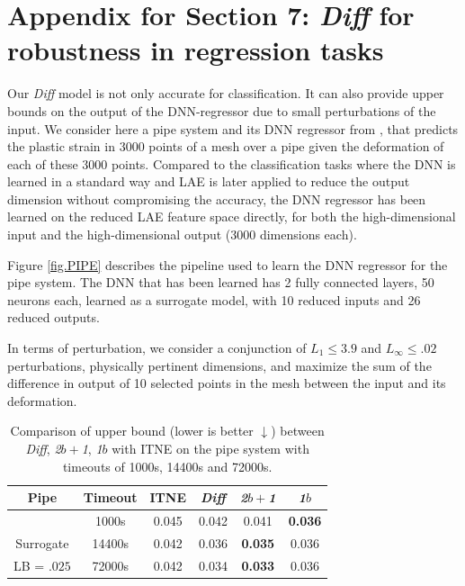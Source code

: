 \section{Appendix for Section 7: {\em Diff} for robustness in regression tasks}


Our {\em Diff} model is not only accurate for classification. It can also provide upper bounds on the output of the DNN-regressor due to small perturbations of the input.
We consider here a pipe system and its DNN regressor from \cite{aiware},
that predicts the plastic strain in 3000 points of a mesh over a pipe given the deformation of each of these 3000 points.
Compared to the classification tasks where the DNN is learned in a standard way and LAE is later applied to reduce the output dimension without compromising the accuracy, the DNN regressor has been learned on the reduced LAE feature space directly, for both the high-dimensional input and the high-dimensional output (3000 dimensions each).







Figure \ref{fig.PIPE} describes the pipeline used to learn the DNN regressor for the pipe system. The DNN that has been learned has 2 fully connected layers, 50 neurons each, learned as a surrogate model, with 10 reduced inputs and 26 reduced outputs.

In terms of perturbation, we consider a conjunction of $L_1 \leq 3.9$ and $L_\infty \leq .02$ perturbations, physically pertinent dimensions, and maximize the sum of the difference in output of 10 selected points in the mesh between the input and its deformation.





\begin{table}[h!]
	\centering
	\begin{tabular}{|c | c c c c c|} 
		\hline
		Pipe & Timeout & ITNE & {\em Diff} & {\em 2$b+$1} & {\em 1$b$}
		\\\hline 
		& 1000s & 0.045 & 0.042 & 0.041 & {\bf 0.036}
		\\
		Surrogate  & 14400s & 0.042 & 0.036 & {\bf 0.035} & 0.036
		\\
		LB = $.025$  & 72000s & 0.042 & 0.034 & {\bf 0.033} & 0.036
		\\\hline
	\end{tabular}
	\caption{Comparison of upper bound (lower is better $\downarrow$) between {\em Diff}, {\em 2$b+$1}, {\em 1$b$} with ITNE on the pipe system with timeouts of 1000s, 14400s and 72000s.}
\label{table.pipe}
\end{table}




